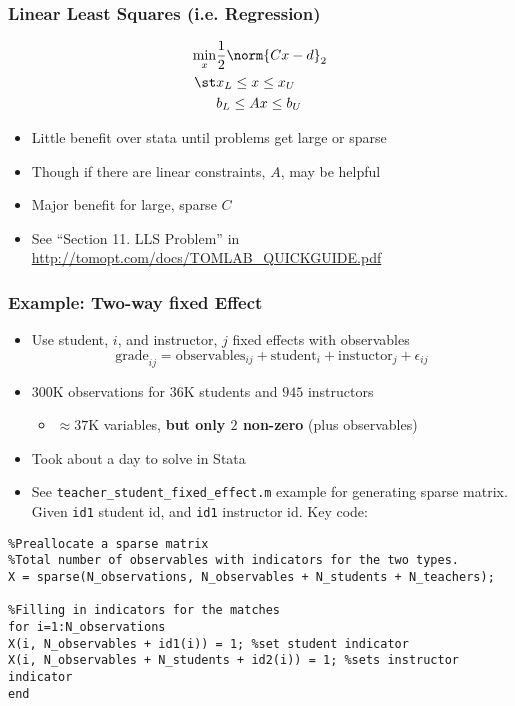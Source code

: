 \documentclass[nofootline]{etk-presentation}
\begin{document}
\begin{frame}[fragile]	\frametitle{Linear Least Squares (i.e. Regression)}

	\begin{align*}
	\min_x &\frac{1}{2}\norm{C x - d}_2\\
	\st & x_L \leq x \leq x_U\\
	& b_L \leq A x \leq b_U
	\end{align*}
	
	\begin{itemize}
		\item Little benefit over stata until problems get large or sparse
		\item Though if there are linear constraints, $A$, may be helpful
		\item Major benefit for large, sparse $C$
		\item See ``Section 11. LLS Problem'' in \url{http://tomopt.com/docs/TOMLAB_QUICKGUIDE.pdf}
	\end{itemize}
\end{frame}


\begin{frame}[fragile]	\frametitle{Example: Two-way fixed Effect}
	\begin{itemize}
		\item 	Use student, $i$, and instructor, $j$ fixed effects with observables
			$$
		\text{grade}_{ij} = \text{observables}_{ij} + \text{student}_i + \text{instuctor}_j + \epsilon_{ij}
		$$
		\item $300$K observations for $36$K students and $945$ instructors
		\begin{itemize}
			\item $\approx 37$K variables, \textbf{but only $2$ non-zero} (plus observables)
		\end{itemize}
		\item Took about a day to solve in Stata
		\item See \verb!teacher_student_fixed_effect.m! example for generating sparse matrix.  Given \verb!id1! student id, and \verb!id1! instructor id.  Key code:
	\end{itemize}
\begin{verbatim}
%Preallocate a sparse matrix
%Total number of observables with indicators for the two types.
X = sparse(N_observations, N_observables + N_students + N_teachers); 

%Filling in indicators for the matches
for i=1:N_observations
X(i, N_observables + id1(i)) = 1; %set student indicator
X(i, N_observables + N_students + id2(i)) = 1; %sets instructor indicator
end
\end{verbatim}
\end{frame}
\end{document}

